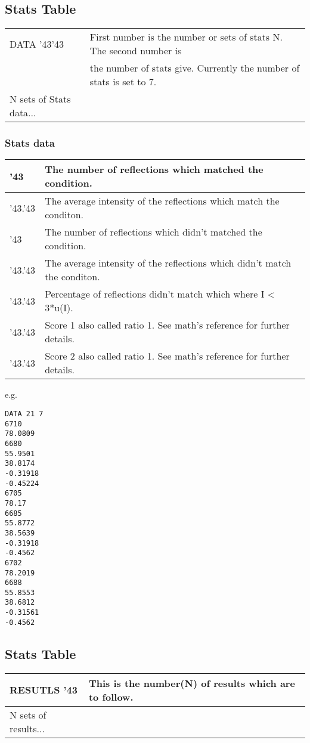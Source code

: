 \documentclass[11pt]{article}
\newcommand{\hash}{\char '43} %
\begin{document}
\subsection{Stats Table}
\begin{table}[h]
\begin{tabular}{|l|l|}\hline
DATA \hash   \hash & First number is the number or sets of stats N. The second number is \\
				& the number of stats give. Currently the number of stats is set to 7.\\
\hline
N sets of Stats data... &\\\hline
\end{tabular}
\end{table}
\subsubsection{Stats data}
\begin{table}[h]
\begin{tabular}{|l|l|}\hline
\hash & The number of reflections which matched the condition.\\\hline
\hash.\hash & The average intensity of the reflections which match the conditon.\\\hline
\hash & The number of reflections which didn't matched the condition.\\\hline
\hash.\hash & The average intensity of the reflections which didn't match the conditon.\\\hline
\hash.\hash & Percentage of reflections didn't match which where I < 3*u(I).\\\hline
\hash.\hash & Score 1 also called ratio 1. See math's reference for further details.\\\hline
\hash.\hash & Score 2 also called ratio 1. See math's reference for further details.\\\hline
\hline
\end{tabular}
\end{table}
e.g.
\begin{verbatim}
DATA 21 7
6710
78.0809
6680
55.9501
38.8174
-0.31918
-0.45224
6705
78.17
6685
55.8772
38.5639
-0.31918
-0.4562
6702
78.2019
6688
55.8553
38.6812
-0.31561
-0.4562
\end{verbatim}
\subsection{Stats Table}
\begin{table}[h]
\begin{tabular}{|l|l|}\hline
RESUTLS \hash & This is the number(N) of results which are to follow.\\
\hline
N sets of results... &\\\hline
\end{tabular}
\end{table}
\end{document}
